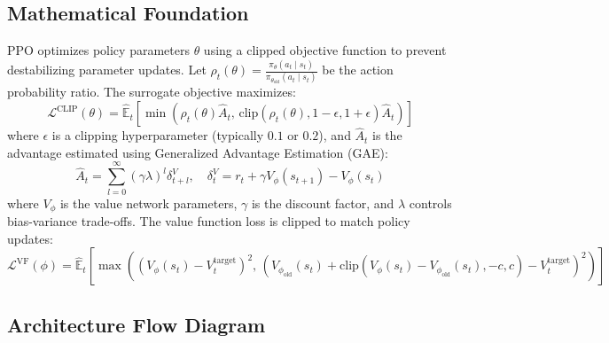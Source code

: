 \documentclass{article}
\begin{document}
\subsection{Mathematical Foundation}
PPO optimizes policy parameters $\theta$ using a clipped objective function to prevent destabilizing parameter updates. Let $\rho_t(\theta) = \frac{\pi_\theta(a_t \mid s_t)}{\pi_{\theta_{\text{old}}}(a_t \mid s_t)}$ be the action probability ratio. The surrogate objective maximizes:
\begin{equation}
  \mathcal{L}^{\text{CLIP}}(\theta) = \hat{\mathbb{E}}_t \left[ \min\left( \rho_t(\theta) \hat{A}_t, \, \text{clip}(\rho_t(\theta), 1-\epsilon, 1+\epsilon) \hat{A}_t \right) \right]
\end{equation}
where $\epsilon$ is a clipping hyperparameter (typically $0.1$ or $0.2$), and $\hat{A}_t$ is the advantage estimated using Generalized Advantage Estimation (GAE):
\begin{equation}
  \hat{A}_t = \sum_{l=0}^\infty (\gamma \lambda)^l \delta_{t+l}^V, \quad \delta_t^V = r_t + \gamma V_\phi(s_{t+1}) - V_\phi(s_t)
\end{equation}
where $V_\phi$ is the value network parameters, $\gamma$ is the discount factor, and $\lambda$ controls bias-variance trade-offs. The value function loss is clipped to match policy updates:
\begin{equation}
  \mathcal{L}^{\text{VF}}(\phi) = \hat{\mathbb{E}}_t \left[ \max\left( (V_\phi(s_t) - V_t^{\text{target}})^2, \, (V_{\phi_{\text{old}}}(s_t) + \text{clip}(V_\phi(s_t) - V_{\phi_{\text{old}}}(s_t), -c, c) - V_t^{\text{target}})^2 \right) \right]
\end{equation}

\subsection{Architecture Flow Diagram}
\end{document}
